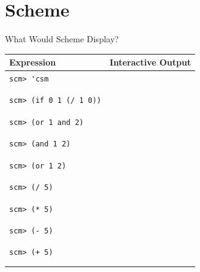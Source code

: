 \documentclass{exam}
\begin{document}
\section{Scheme}
\begin{questions}

\item What Would Scheme Display?
\begin{center}
    \begin{tabular}{|m{9cm}|m{6cm}|}
\hline
\textbf{Expression} & \textbf{Interactive Output} \\
\hline
\lstinline$scm> 'csm$ & \\ & \\ & \\
\hline
\lstinline$scm> (if 0 1 (/ 1 0))$ & \\ & \\ & \\
\hline
\lstinline$scm> (or 1 and 2)$ & \\ & \\ & \\
\hline
\lstinline$scm> (and 1 2)$ & \\ & \\ & \\
\hline
\lstinline$scm> (or 1 2)$ & \\ & \\ & \\
\hline
\lstinline$scm> (/ 5)$ & \\ & \\ & \\
\hline
\lstinline$scm> (* 5)$ & \\ & \\ & \\
\hline
\lstinline$scm> (- 5)$ & \\ & \\ & \\
\hline
\lstinline$scm> (+ 5)$ & \\ & \\ & \\
\hline
\end{tabular}
\end{center}


\end{questions}
\end{document}
